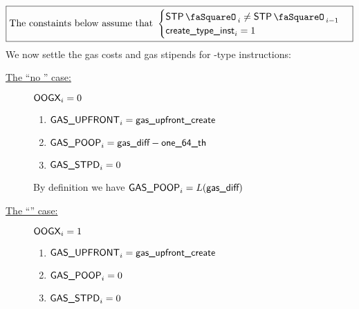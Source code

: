 \[
	\boxed{\text{The constaints below assume that }
	\begin{cases}
		\stpStamp_{i} \neq \stpStamp_{i - 1} \\
		\isCreate_{i} =    1                 \\
	\end{cases}
	}
\]
We now settle the gas costs and gas stipends for -type instructions:
\begin{description}
	\item[\underline{The ``no \oogxSH{}'' case:}] \If $\textsf{OOGX}_{i} = 0$ \Then
		\begin{enumerate}
			\item $\textsf{GAS}\textsf{\_UPFRONT}_{i} = \textsf{gas\_upfront}\textsf{\_create}$
			\item $\textsf{GAS}\textsf{\_POOP}_{i} = \textsf{gas\_diff} - \textsf{one\_64\_th}$
			\item $\textsf{GAS}\textsf{\_STPD}_{i} = 0$
		\end{enumerate}
		\saNote{} By definition we have $\textsf{GAS}\textsf{\_POOP}_{i} = L(\textsf{gas\_diff})$
	\item[\underline{The ``\oogxSH{}'' case:}] \If $\textsf{OOGX}_{i} = 1$ \Then
		\begin{enumerate}
			\item $\textsf{GAS}\textsf{\_UPFRONT}_{i} = \textsf{gas\_upfront}\textsf{\_create}$
			\item $\textsf{GAS}\textsf{\_POOP}_{i} = 0$
			\item $\textsf{GAS}\textsf{\_STPD}_{i} = 0$
		\end{enumerate}
\end{description}
